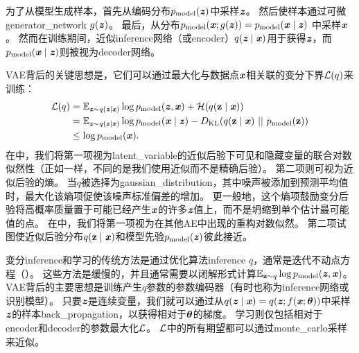 为了从模型生成样本，首先从编码分布$p_{\text{model}}(\Vz)$中采样$\Vz$。
然后使样本通过可微\gls{generator_network} $g(\Vz)$。
最后，从分布$p_{\text{model}}(\Vx;g(\Vz)) = p_{\text{model}}(\Vx  \mid  \Vz)$ 中采样$\Vx$。
然而在训练期间，近似\gls{inference}网络（或\gls{encoder}）$q(\Vz  \mid  \Vx)$用于获得$\Vz$，而$p_{\text{model}}(\Vx  \mid  \Vz)$则被视为\gls{decoder}网络。


\gls{VAE}背后的关键思想是，它们可以通过最大化与数据点$\Vx$相关联的变分下界$\CalL(q)$来训练：
\begin{align}
\CalL(q) &= \SetE_{\Vz \sim q(\Vz  \mid  \Vx)} \log p_{\text{model}} (\Vz, \Vx)
+ \CalH(q(\RVz  \mid  \Vx)) \label{eq:var_lower}  \\
&= \SetE_{\Vz \sim q(\Vz  \mid  \Vx)} \log p_{\text{model}} (\Vx  \mid  \Vz)
- D_{\text{KL}}(q(\RVz  \mid  \Vx) ~||~ p_{\text{model}}(\RVz)) \label{eq:var_kl} \\
& \leq \log p_{\text{model}}(\Vx).
\end{align}
在中，我们将第一项视为\gls{latent_variable}的近似后验下可见和隐藏变量的联合对数似然性（正如一样，不同的是我们使用近似而不是精确后验）。
第二项则可视为近似后验的熵。
当$q$被选择为\gls{gaussian_distribution}，其中噪声被添加到预测平均值时，最大化该熵项促使该噪声标准偏差的增加。
更一般地，这个熵项鼓励变分后验将高概率质量置于可能已经产生$\Vx$的许多$\Vz$值上，而不是坍缩到单个估计最可能值的点。
在中，我们将第一项视为在其他\gls{AE}中出现的重构对数似然。
第二项试图使近似后验分布$q(\RVz  \mid  \Vx)$和模型先验$p_{\text{model}}(\Vz)$彼此接近。


变分\gls{inference}和学习的传统方法是通过优化算法\gls{inference} $q$，通常是迭代不动点方程（）。
这些方法是缓慢的，并且通常需要以闭解形式计算$\SetE_{\RVz \sim q} \log p_{\text{model}} (\Vz, \Vx)$。 %
\gls{VAE}背后的主要思想是训练产生$q$参数的参数编码器（有时也称为\gls{inference}网络或识别模型）。
只要$\Vz$是连续变量，我们就可以通过从$q(\Vz  \mid  \Vx) = q(\Vz; f(\Vx; \Vtheta))$中采样$\Vz$的样本\gls{back_propagation}，以获得相对于$\Vtheta$的梯度。
学习则仅包括相对于\gls{encoder}和\gls{decoder}的参数最大化$\CalL$。
$\CalL$中的所有期望都可以通过\gls{monte_carlo}采样来近似。


